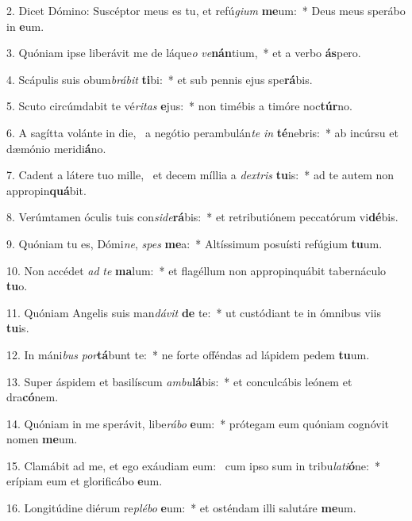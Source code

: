 2. Dicet Dómino: Suscéptor meus es tu, et refú\textit{gi}\textit{um} \textbf{me}um:~*  Deus meus sperábo in \textbf{e}um.\

3. Quóniam ipse liberávit me de láque\textit{o} \textit{ve}\textbf{nán}tium,~*  et a verbo \textbf{ás}pero.\

4. Scápulis suis obum\textit{brá}\textit{bit} \textbf{ti}bi:~*  et sub pennis ejus spe\textbf{rá}bis.\

5. Scuto circúmdabit te vé\textit{ri}\textit{tas} \textbf{e}jus:~*  non timébis a timóre noc\textbf{túr}no.\

6. A sagítta volánte in die, \dag\  a negótio perambulán\textit{te} \textit{in} \textbf{té}nebris:~*  ab incúrsu et dæmónio meridi\textbf{á}no.\

7. Cadent a látere tuo mille, \dag\  et decem míllia a \textit{dex}\textit{tris} \textbf{tu}is:~*  ad te autem non appropin\textbf{quá}bit.\

8. Verúmtamen óculis tuis con\textit{si}\textit{de}\textbf{rá}bis:~*  et retributiónem peccatórum vi\textbf{dé}bis.\

9. Quóniam tu es, Dómi\textit{ne}, \textit{spes} \textbf{me}a:~*  Altíssimum posuísti refúgium \textbf{tu}um.\

10. Non accédet \textit{ad} \textit{te} \textbf{ma}lum:~*  et flagéllum non appropinquábit tabernáculo \textbf{tu}o.\

11. Quóniam Angelis suis man\textit{dá}\textit{vit} \textbf{de} te:~*  ut custódiant te in ómnibus viis \textbf{tu}is.\

12. In máni\textit{bus} \textit{por}\textbf{tá}bunt te:~*  ne forte offéndas ad lápidem pedem \textbf{tu}um.\

13. Super áspidem et basilíscum \textit{am}\textit{bu}\textbf{lá}bis:~*  et conculcábis leónem et dra\textbf{có}nem.\

14. Quóniam in me sperávit, libe\textit{rá}\textit{bo} \textbf{e}um:~*  prótegam eum quóniam cognóvit nomen \textbf{me}um.\

15. Clamábit ad me, et ego exáudiam eum: \dag\  cum ipso sum in tribu\textit{la}\textit{ti}\textbf{ó}ne:~*  erípiam eum et glorificábo \textbf{e}um.\

16. Longitúdine diérum re\textit{plé}\textit{bo} \textbf{e}um:~*  et osténdam illi salutáre \textbf{me}um.\


